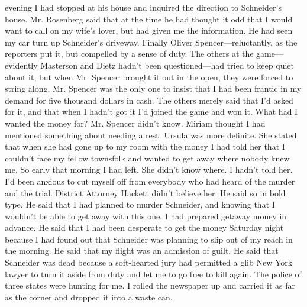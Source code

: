 \documentclass{novel}
\begin{document}
evening I had stopped at his house and inquired the direction to Schneider’s house. Mr. Rosenberg said that at the time he had thought it odd that I would want to call on my wife’s lover, but had given me the information. He had seen my car turn up Schneider’s driveway. Finally Oliver Spencer—reluctantly, as the reporters put it, but compelled by a sense of duty. The others at the game—evidently Masterson and Dietz hadn’t been questioned—had tried to keep quiet about it, but when Mr. Spencer brought it out in the open, they were forced to string along. Mr. Spencer was the only one to insist that I had been frantic in my demand for five thousand dollars in cash. The others merely said that I’d asked for it, and that when I hadn’t got it I’d joined the game and won it. What had I wanted the money for? Mr. Spencer didn’t know. Miriam thought I had mentioned something about needing a rest. Ursula was more definite. She stated that when she had gone up to my room with the money I had told her that I couldn’t face my fellow townsfolk and wanted to get away where nobody knew me. So early that morning I had left. She didn’t know where. I hadn’t told her. I’d been anxious to cut myself off from everybody who had heard of the murder and the trial. District Attorney Hackett didn’t believe her. He said so in bold type. He said that I had planned to murder Schneider, and knowing that I wouldn’t be able to get away with this one, I had prepared getaway money in advance. He said that I had been desperate to get the money Saturday night because I had found out that Schneider was planning to slip out of my reach in the morning. He said that my flight was an admission of guilt. He said that Schneider was dead because a soft-hearted jury had permitted a glib New York lawyer to turn it aside from duty and let me to go free to kill again. The police of three states were hunting for me. I rolled the newspaper up and carried it as far as the corner and dropped it into a waste can.


\begin{ChapterStart}

\vspace{3\nbs}
\end{ChapterStart}

\end{document}

